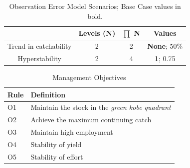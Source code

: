 \documentclass[%
nonumbib,      %
%
]{nrc1}                          %
\begin{document}
\begin{table}
\begin{center}
\begin{tabular}{|cccc|}
\hline
\end{tabular}
\end{center}
\end{table}


\begin{table}
\label{tab:oem}
\caption{Observation Error Model Scenarios; Base Case values in bold.}  
\begin{center}
\label{tab:datasumm}
\begin{tabular}{|cccc|}
\hline
			& {\tiny Levels (N)} & {\tiny $\prod$ N} & {\tiny Values} \\ 
\hline\hline
{\tiny Trend in catchability } & {\tiny 2} 	 & {\tiny   2}  & {\tiny  \textbf{None}; 50\%}   \\
{\tiny Hyperstability}	       & {\tiny 2} 	 & {\tiny   4}  & {\tiny  \textbf{1}; 0.75}     \\
\hline
\end{tabular}
\end{center}
\end{table}


\begin{table}[h!]
  \label{tab:objectives}
  \caption{Management Objectives}  
  \begin{center}
    \begin{tabular}{ l p{10cm} }
    \hline
    Rule & Definition \\
    \hline 
     O1   & Maintain the stock in the \emph{green kobe quadrant}\\
     O2   & Achieve the maximum continuing catch \\
     O3   & Maintain high employment \\
     O4   & Stability of yield \\
     O5   & Stability of effort \\
     \hline
    \end{tabular}
  \end{center}
\end{table}
\end{document}
